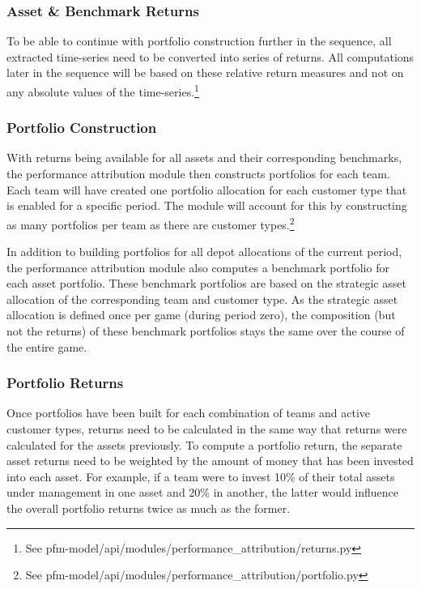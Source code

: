 \subsubsection{Asset \& Benchmark Returns}
To be able to continue with portfolio construction further in the sequence, all extracted time-series need to be converted into series of returns. All computations later in the sequence will be based on these relative return measures and not on any absolute values of the time-series.\footnote{See pfm-model/api/modules/performance\_attribution/returns.py}

\subsubsection{Portfolio Construction}
With returns being available for all assets and their corresponding benchmarks, the performance attribution module then constructs portfolios for each team. Each team will have created one portfolio allocation for each customer type that is enabled for a specific period. The module will account for this by constructing as many portfolios per team as there are customer types.\footnote{See pfm-model/api/modules/performance\_attribution/portfolio.py}

In addition to building portfolios for all depot allocations of the current period, the performance attribution module also computes a benchmark portfolio for each asset portfolio. These benchmark portfolios are based on the strategic asset allocation of the corresponding team and customer type. As the strategic asset allocation is defined once per game (during period zero), the composition (but not the returns) of these benchmark portfolios stays the same over the course of the entire game.

\subsubsection{Portfolio Returns}
Once portfolios have been built for each combination of teams and active customer types, returns need to be calculated in the same way that returns were calculated for the assets previously. To compute a portfolio return, the separate asset returns need to be weighted by the amount of money that has been invested into each asset. For example, if a team were to invest 10\% of their total assets under management in one asset and 20\% in another, the latter would influence the overall portfolio returns twice as much as the former.

